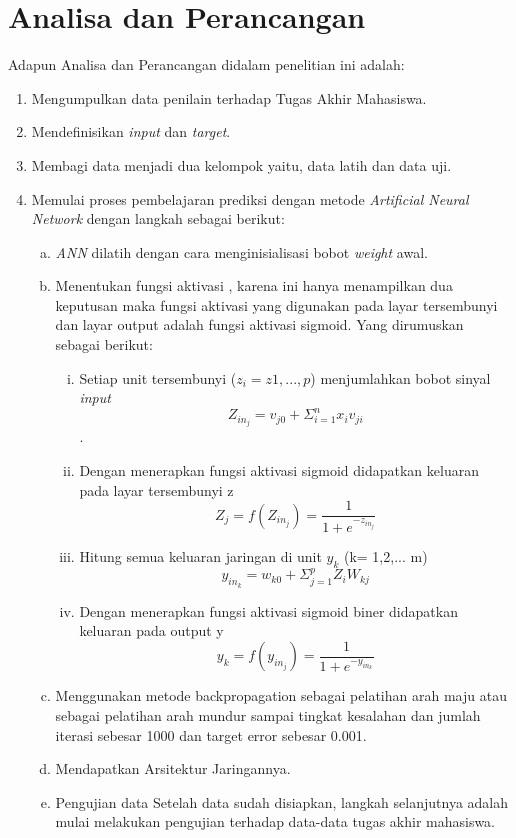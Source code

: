 \section{Analisa dan Perancangan}
 Adapun Analisa dan Perancangan didalam penelitian ini adalah:
\begin{enumerate}
	\item  Mengumpulkan data penilain terhadap Tugas Akhir Mahasiswa.
	\item Mendefinisikan \emph{input} dan \emph{target}.
	\item Membagi data menjadi dua kelompok yaitu, data latih dan data uji.
	\item Memulai proses pembelajaran prediksi dengan metode \emph{Artificial Neural Network} dengan langkah sebagai berikut:
	\begin{enumerate}[a.]
		\item \emph{ANN} dilatih dengan cara menginisialisasi bobot \emph{weight} awal.
		\item Menentukan fungsi aktivasi , karena ini hanya menampilkan dua keputusan maka fungsi aktivasi yang digunakan pada layar tersembunyi dan layar output adalah fungsi aktivasi sigmoid. Yang dirumuskan sebagai berikut:
		\begin{enumerate}[i.]
			\item Setiap unit tersembunyi ($ z_i = z1,...,p $) menjumlahkan bobot sinyal \emph{input} $$ Z_{in_{j}} = v_{j0} + \Sigma^{n}_{i=1} x_{i} v_{ji} $$.
			\item Dengan menerapkan fungsi aktivasi sigmoid didapatkan keluaran pada layar tersembunyi z $$ Z_{j} = f (Z_{in_{j}}) = \frac{1}{1+e^{-z_{in_{j}}}} $$
			\item Hitung semua keluaran jaringan di unit $y_{k}$ (k= 1,2,... m) $$ y_{in_{k}} = w_{k0} + \Sigma^{p}_{j=1} Z_{i} W_{kj} $$
			\item Dengan menerapkan fungsi aktivasi sigmoid biner didapatkan keluaran pada output y $$ y_{k} = f(y_{in_{j}}) = \frac{1}{1+e^{-y_{in_{k}}}} $$
		\end{enumerate}
	
		\item Menggunakan metode backpropagation sebagai pelatihan arah maju atau sebagai pelatihan arah mundur sampai tingkat kesalahan dan jumlah iterasi sebesar 1000 dan target error sebesar 0.001.
		\item  Mendapatkan Arsitektur Jaringannya.
		\item  Pengujian data Setelah data sudah disiapkan, langkah selanjutnya adalah mulai melakukan pengujian terhadap data-data tugas akhir mahasiswa.
	\end{enumerate}
\end{enumerate}
\begin{comment}

\end{comment}
